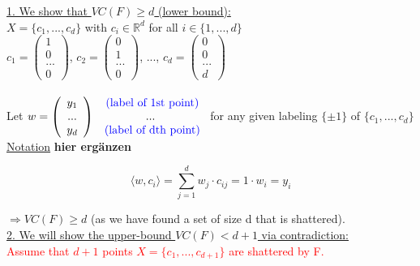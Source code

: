 \documentclass[10pt,a4paper]{article}
\theoremstyle{definition}
\theoremstyle{plain}
\begin{document}
\underline{1. We show that $VC(F)\geq d$ (lower bound):}\\
	$X = \{ c_1, ..., c_d \}$ with $c_i \in \mathbb{R}^d$ for all $i \in \{ 1, ..., d \}$\\
	$c_1 = \left(\begin{array}{c} 1 \\ 0 \\ ... \\ 0 \end{array}\right)$,
	$c_2 = \left(\begin{array}{c} 0 \\ 1 \\ ... \\ 0 \end{array}\right)$,
	..., 
	$c_d = \left(\begin{array}{c} 0 \\ 0 \\ ... \\ d \end{array}\right)$\\
	\\
	Let 
	$w = \left(\begin{array}{c} 
		y_1 \\
		 ... \\
		 y_d \end{array}\right)
		 \begin{array}{c} 
		 	\textcolor{blue}{\text{ (label of 1st point)}}  \\
		 	... \\
		 	\textcolor{blue}{\text{ (label of dth point)}}  
		 \end{array}$ 
	for any given labeling $\{ \pm 1 \}$ of $\{ c_1, ..., c_d \}$\\
	
	\underline{Notation} \textbf{hier ergänzen}
	
	$$
		\langle w, c_i \rangle = \sum_{j=1}^{d} w_j \cdot c_{ij} = 1 \cdot w_i = y_i 
	$$
	
	$\Rightarrow VC(F) \geq d$ (as we have found a set of size d that is shattered).\\
	

\underline{2. We will show the upper-bound $VC(F) < d+1$ via contradiction:}
	\\

	\textcolor{red}{
		Assume that $d+1$ points $X = \{ c_1, ..., c_{d+1} \}$ are shattered by F.}
	
\end{document}
